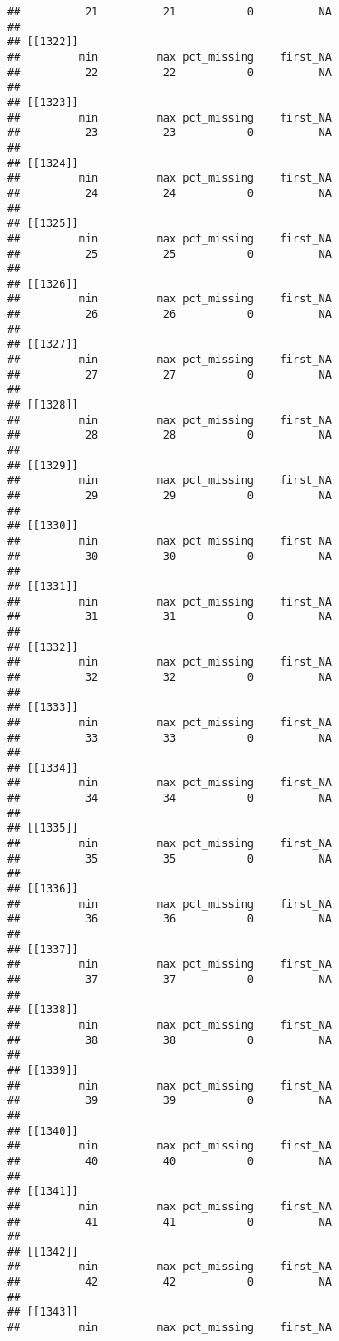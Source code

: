\documentclass[
]{article}
\begin{document}
\begin{verbatim}
##          21          21           0          NA 
## 
## [[1322]]
##         min         max pct_missing    first_NA 
##          22          22           0          NA 
## 
## [[1323]]
##         min         max pct_missing    first_NA 
##          23          23           0          NA 
## 
## [[1324]]
##         min         max pct_missing    first_NA 
##          24          24           0          NA 
## 
## [[1325]]
##         min         max pct_missing    first_NA 
##          25          25           0          NA 
## 
## [[1326]]
##         min         max pct_missing    first_NA 
##          26          26           0          NA 
## 
## [[1327]]
##         min         max pct_missing    first_NA 
##          27          27           0          NA 
## 
## [[1328]]
##         min         max pct_missing    first_NA 
##          28          28           0          NA 
## 
## [[1329]]
##         min         max pct_missing    first_NA 
##          29          29           0          NA 
## 
## [[1330]]
##         min         max pct_missing    first_NA 
##          30          30           0          NA 
## 
## [[1331]]
##         min         max pct_missing    first_NA 
##          31          31           0          NA 
## 
## [[1332]]
##         min         max pct_missing    first_NA 
##          32          32           0          NA 
## 
## [[1333]]
##         min         max pct_missing    first_NA 
##          33          33           0          NA 
## 
## [[1334]]
##         min         max pct_missing    first_NA 
##          34          34           0          NA 
## 
## [[1335]]
##         min         max pct_missing    first_NA 
##          35          35           0          NA 
## 
## [[1336]]
##         min         max pct_missing    first_NA 
##          36          36           0          NA 
## 
## [[1337]]
##         min         max pct_missing    first_NA 
##          37          37           0          NA 
## 
## [[1338]]
##         min         max pct_missing    first_NA 
##          38          38           0          NA 
## 
## [[1339]]
##         min         max pct_missing    first_NA 
##          39          39           0          NA 
## 
## [[1340]]
##         min         max pct_missing    first_NA 
##          40          40           0          NA 
## 
## [[1341]]
##         min         max pct_missing    first_NA 
##          41          41           0          NA 
## 
## [[1342]]
##         min         max pct_missing    first_NA 
##          42          42           0          NA 
## 
## [[1343]]
##         min         max pct_missing    first_NA 

\end{verbatim}
\end{document}

